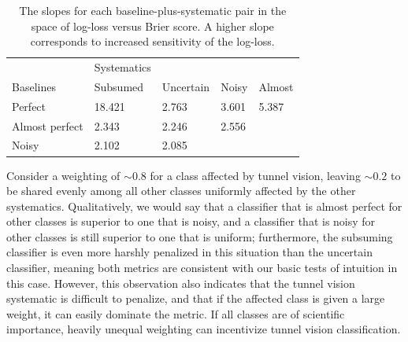 \begin{table}[]
\begin{tabular}{l|llll}
	& Systematics & & &\\
Baselines & Subsumed & Uncertain & Noisy & Almost\\
\hline
Perfect & 18.421 & 2.763 & 3.601 & 5.387\\
Almost perfect & 2.343 & 2.246 & 2.556 & \\
Noisy & 2.102 & 2.085 & & \\
\end{tabular}
\caption{The slopes for each baseline-plus-systematic pair in the space of log-loss  versus Brier score.
A higher slope corresponds to increased sensitivity of the log-loss.}
\label{tab:slopes}
\end{table}

Consider a weighting of $\sim0.8$ for a class affected by tunnel vision, leaving $\sim0.2$ to be shared evenly among all other classes uniformly affected by the other systematics.
Qualitatively, we would say that a classifier that is almost perfect for other classes is superior to one that is noisy, and a classifier that is noisy for other classes is still superior to one that is uniform; furthermore, the subsuming classifier is even more harshly penalized in this situation than the uncertain classifier, meaning both metrics are  consistent with our basic tests of intuition in this case.
However, this observation also indicates that the tunnel vision systematic is difficult to penalize, and that if the affected class is given a large weight, it can easily dominate the metric.
If all classes are of scientific importance, heavily unequal weighting can incentivize tunnel vision classification.



